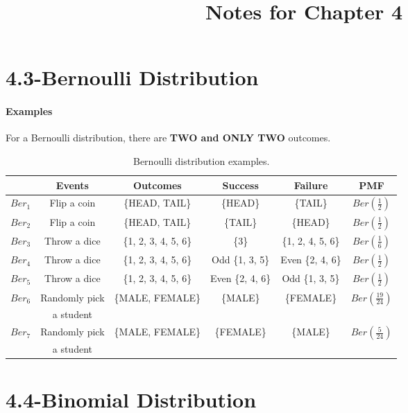 \documentclass{article} %
\title{Notes for Chapter 4}
\begin{document}
\maketitle

\section*{4.3-Bernoulli Distribution}
\paragraph*{Examples} For a Bernoulli distribution, there are {\bf TWO and ONLY TWO} outcomes. 
\begin{table}[h!]
\begin{center}
\renewcommand{\arraystretch}{1.5}
\begin{tabular}{|c|c|c|c|c|c|} \hline
& Events & Outcomes & Success & Failure & PMF \\ \hline 
$Ber_1$ & Flip a coin & \{HEAD, TAIL\} & \{HEAD\} & \{TAIL\} & $Ber(\frac{1}{2})$ \\ \hline
$Ber_2$ & Flip a coin & \{HEAD, TAIL\} & \{TAIL\} & \{HEAD\} & $Ber(\frac{1}{2})$ \\ \hline
$Ber_3$ & Throw a dice & \{1, 2, 3, 4, 5, 6\} & \{3\} & \{1, 2, 4, 5, 6\} & $Ber(\frac{1}{6})$ \\ \hline
$Ber_4$ & Throw a dice & \{1, 2, 3, 4, 5, 6\} & Odd \{1, 3, 5\} & Even \{2, 4, 6\} & $Ber(\frac{1}{2})$ \\ \hline
$Ber_5$ & Throw a dice & \{1, 2, 3, 4, 5, 6\} & Even \{2, 4, 6\} & Odd \{1, 3, 5\} & $Ber(\frac{1}{2})$ \\ \hline
\multirow{2}{*}{$Ber_6$} & Randomly pick & \multirow{2}{*}{\{MALE, FEMALE\}} & \multirow{2}{*}{\{MALE\}} & \multirow{2}{*}{\{FEMALE\}} & \multirow{2}{*}{$Ber(\frac{19}{24})$} \\
& a student & & & & \\ \hline
\multirow{2}{*}{$Ber_7$} & Randomly pick & \multirow{2}{*}{\{MALE, FEMALE\}} & \multirow{2}{*}{\{FEMALE\}} & \multirow{2}{*}{\{MALE\}} & \multirow{2}{*}{$Ber(\frac{5}{24})$} \\
& a student& & & & \\
\hline
\end{tabular}
\caption{Bernoulli distribution examples.}
\label{Ta:ber}
\end{center}
\end{table}

\newpage 

\section*{4.4-Binomial Distribution}
\end{document}
